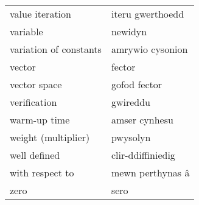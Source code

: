 \begin{supertabular}{p{0.22\textwidth}p{0.22\textwidth}}
value iteration & iteru gwerthoedd \\
variable & newidyn \\
variation of constants & amrywio cysonion \\
vector & fector \\
vector space & gofod fector \\
verification & gwireddu \\
warm-up time & amser cynhesu \\
weight (multiplier) & pwysolyn \\
well defined & clir-ddiffiniedig \\
with respect to & mewn perthynas â \\
zero & sero \\
\end{supertabular}
